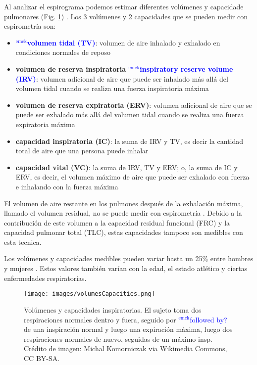 \documentclass[12pt]{article}
\newcommand{\emck}[1]{\textcolor{blue}{$^{\textrm{emck}}${#1}}}
\begin{document}
Al analizar el espirograma podemos estimar diferentes volúmenes y
capacidade pulmonares (Fig. \ref{fig:volsCaps})
\cite{guyton20006textbook,openStax2016resp}. Los 3 volúmenes y 2
capacidades que se pueden medir con espirometría son:

\begin{itemize}
\item \textbf{\emck{volumen tidal (TV)}}: volumen de aire inhalado y
  exhalado en condiciones normales de reposo
\item \textbf{volumen de reserva inspiratoria \emck{inspiratory
    reserve volume (IRV)}}: volumen adicional de aire que puede ser
  inhalado más allá del volumen tidal cuando se realiza una fuerza
  inspiratoria máxima
\item \textbf{volumen de reserva expiratoria (ERV)}: volumen adicional
  de aire que se puede ser exhalado más allá del volumen tidal cuando
  se realiza una fuerza expiratoria máxima
\item \textbf{capacidad inspiratoria (IC)}: la suma de IRV y TV, es
  decir la cantidad total de aire que una persona puede inhalar
\item \textbf{capacidad vital (VC)}: la suma de IRV, TV y ERV; o, la
  suma de IC y ERV, es decir, el volumen máximo de aire que puede ser
  exhalado con fuerza e inhalando con la fuerza máxima
\end{itemize}

El volumen de aire restante en los pulmones después de la exhalación
máxima, llamado el volumen residual, no se puede medir con
espirometría \cite{guyton20006textbook}. Debido a la contribución de
este volumen a la capacidad residual funcional (FRC) y la capacidad
pulmonar total (TLC), estas capacidades tampoco son medibles con esta
tecnica.

Los volúmenes y capacidades medibles pueden variar hasta un 25\% entre
hombres y mujeres \cite{guyton20006textbook}. Estos valores también varían
con la edad, el estado atlético y ciertas enfermedades respiratorias.

\begin{figure}[h!]
\centering
\texttt{[image: images/volumesCapacities.png]}
\caption{Volúmenes y capacidades inspiratorias. El sujeto toma dos
  respiraciones normales dentro y fuera, seguido por \emck{followed
    by?} de una inspiración normal y luego una expiración máxima,
  luego dos respiraciones normales de nuevo, seguidas de un máximo
  insp.  Crédito de imagen: Michal Komorniczak via Wikimedia Commons,
  CC BY-SA.}
\label{fig:volsCaps}
\end{figure}
\end{document}
